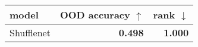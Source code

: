 \begin{tabular}{lrr}
\toprule
     model & OOD accuracy $\uparrow$ & rank $\downarrow$ \\
\midrule
Shufflenet &          \textbf{0.498} &    \textbf{1.000} \\
\bottomrule
\end{tabular}


